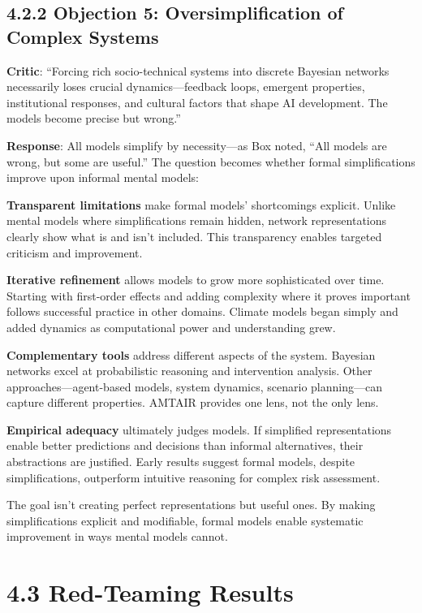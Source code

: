 \documentclass[
  11pt,
  letterpaper,
]{book}
\begin{document}
\subsection*{4.2.2 Objection 5: Oversimplification of Complex
Systems}\label{sec-oversimplification}

\textbf{Critic}: ``Forcing rich socio-technical systems into discrete
Bayesian networks necessarily loses crucial dynamics---feedback loops,
emergent properties, institutional responses, and cultural factors that
shape AI development. The models become precise but wrong.''

\textbf{Response}: All models simplify by necessity---as Box noted,
``All models are wrong, but some are useful.'' The question becomes
whether formal simplifications improve upon informal mental models:

\textbf{Transparent limitations} make formal models' shortcomings
explicit. Unlike mental models where simplifications remain hidden,
network representations clearly show what is and isn't included. This
transparency enables targeted criticism and improvement.

\textbf{Iterative refinement} allows models to grow more sophisticated
over time. Starting with first-order effects and adding complexity where
it proves important follows successful practice in other domains.
Climate models began simply and added dynamics as computational power
and understanding grew.

\textbf{Complementary tools} address different aspects of the system.
Bayesian networks excel at probabilistic reasoning and intervention
analysis. Other approaches---agent-based models, system dynamics,
scenario planning---can capture different properties. AMTAIR provides
one lens, not the only lens.

\textbf{Empirical adequacy} ultimately judges models. If simplified
representations enable better predictions and decisions than informal
alternatives, their abstractions are justified. Early results suggest
formal models, despite simplifications, outperform intuitive reasoning
for complex risk assessment.

The goal isn't creating perfect representations but useful ones. By
making simplifications explicit and modifiable, formal models enable
systematic improvement in ways mental models cannot.

\section*{4.3 Red-Teaming Results}\label{sec-red-teaming}
\end{document}
